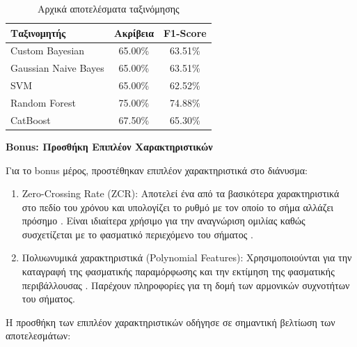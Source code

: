 \documentclass[a4paper,12pt]{article}
\begin{document}
\begin{table}[h]
    \centering
    \begin{tabular}{lcc}
        \hline
        \textbf{Ταξινομητής} & \textbf{Ακρίβεια} & \textbf{F1-Score} \\
        \hline
        Custom Bayesian      & 65.00\%           & 63.51\%           \\
        Gaussian Naive Bayes & 65.00\%           & 63.51\%           \\
        SVM                  & 65.00\%           & 62.52\%           \\
        Random Forest        & 75.00\%           & 74.88\%           \\
        CatBoost             & 67.50\%           & 65.30\%           \\
        \hline
    \end{tabular}
    \caption{Αρχικά αποτελέσματα ταξινόμησης}
\end{table}

\textbf{Bonus: Προσθήκη Επιπλέον Χαρακτηριστικών}

Για το bonus μέρος, προστέθηκαν επιπλέον χαρακτηριστικά στο διάνυσμα:

\begin{enumerate}
    \item Zero-Crossing Rate (ZCR): Αποτελεί ένα από τα βασικότερα χαρακτηριστικά στο
          πεδίο του χρόνου και υπολογίζει το ρυθμό με τον οποίο το σήμα αλλάζει πρόσημο
          \cite{kedem1986spectral}. Είναι ιδιαίτερα χρήσιμο για την αναγνώριση ομιλίας
          καθώς συσχετίζεται με το φασματικό περιεχόμενο του σήματος
          \cite{bachu2010voiced}.

    \item Πολυωνυμικά χαρακτηριστικά (Polynomial Features): Χρησιμοποιούνται για την καταγραφή της
          φασματικής παραμόρφωσης και την εκτίμηση της φασματικής περιβάλλουσας \cite{noll1967cepstrum}. Παρέχουν
          πληροφορίες για τη δομή των αρμονικών συχνοτήτων του σήματος.
\end{enumerate}

Η προσθήκη των επιπλέον χαρακτηριστικών οδήγησε σε σημαντική βελτίωση των αποτελεσμάτων:
\end{document}
